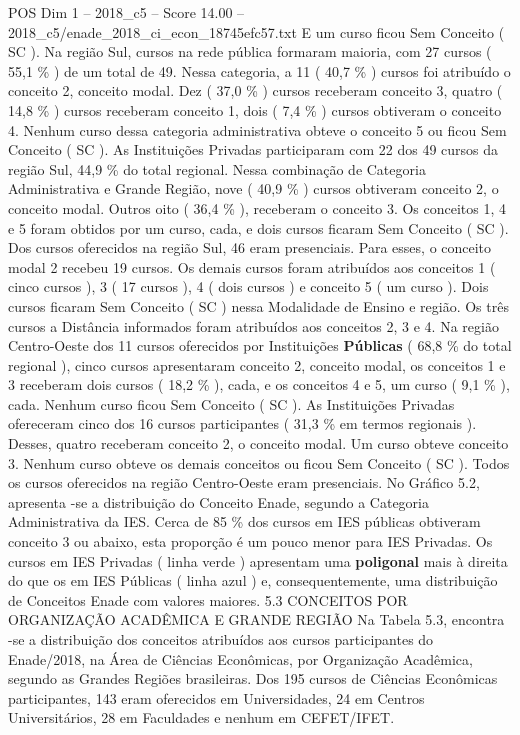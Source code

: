 \begin{textsample}{POS Dim 1 – 2018\_c5 – Score 14.00 – 2018\_c5/enade\_2018\_ci\_econ\_18745efc57.txt}
E um curso ficou Sem Conceito ( SC ).
Na região Sul, cursos na rede pública formaram maioria, com 27 cursos ( 55,1 \% ) de um total de 49.
Nessa categoria, a 11 ( 40,7 \% ) cursos foi atribuído o conceito 2, conceito modal.
Dez ( 37,0 \% ) cursos receberam conceito 3, quatro ( 14,8 \% ) cursos receberam conceito 1, dois ( 7,4 \% ) cursos obtiveram o conceito 4.
Nenhum curso dessa categoria administrativa obteve o conceito 5 ou ficou Sem Conceito ( SC ).
As Instituições Privadas participaram com 22 dos 49 cursos da região Sul, 44,9 \% do total regional.
Nessa combinação de Categoria Administrativa e Grande Região, nove ( 40,9 \% ) cursos obtiveram conceito 2, o conceito modal.
Outros oito ( 36,4 \% ), receberam o conceito 3.
Os conceitos 1, 4 e 5 foram obtidos por um curso, cada, e dois cursos ficaram Sem Conceito ( SC ).
Dos cursos oferecidos na região Sul, 46 eram presenciais.
Para esses, o conceito modal 2 recebeu 19 cursos.
Os demais cursos foram atribuídos aos conceitos 1 ( cinco cursos ), 3 ( 17 cursos ), 4 ( dois cursos ) e conceito 5 ( um curso ).
Dois cursos ficaram Sem Conceito ( SC ) nessa Modalidade de Ensino e região.
Os três cursos a Distância informados foram atribuídos aos conceitos 2, 3 e 4.
Na região Centro-Oeste dos 11 cursos oferecidos por Instituições \textbf{Públicas} ( 68,8 \% do total regional ), cinco cursos apresentaram conceito 2, conceito modal, os conceitos 1 e 3 receberam dois cursos ( 18,2 \% ), cada, e os conceitos 4 e 5, um curso ( 9,1 \% ), cada.
Nenhum curso ficou Sem Conceito ( SC ).
As Instituições Privadas ofereceram cinco dos 16 cursos participantes ( 31,3 \% em termos regionais ).
Desses, quatro receberam conceito 2, o conceito modal.
Um curso obteve conceito 3.
Nenhum curso obteve os demais conceitos ou ficou Sem Conceito ( SC ).
Todos os cursos oferecidos na região Centro-Oeste eram presenciais.
No Gráfico 5.2, apresenta -se a distribuição do Conceito Enade, segundo a Categoria Administrativa da IES.
Cerca de 85 \% dos cursos em IES públicas obtiveram conceito 3 ou abaixo, esta proporção é um pouco menor para IES Privadas.
Os cursos em IES Privadas ( linha verde ) apresentam uma \textbf{poligonal} mais à direita do que os em IES Públicas ( linha azul ) e, consequentemente, uma distribuição de Conceitos Enade com valores maiores. 5.3 CONCEITOS POR ORGANIZAÇÃO ACADÊMICA E GRANDE REGIÃO Na Tabela 5.3, encontra -se a distribuição dos conceitos atribuídos aos cursos participantes do Enade/2018, na Área de Ciências Econômicas, por Organização Acadêmica, segundo as Grandes Regiões brasileiras.
Dos 195 cursos de Ciências Econômicas participantes, 143 eram oferecidos em Universidades, 24 em Centros Universitários, 28 em Faculdades e nenhum em CEFET/IFET.

\end{textsample}
